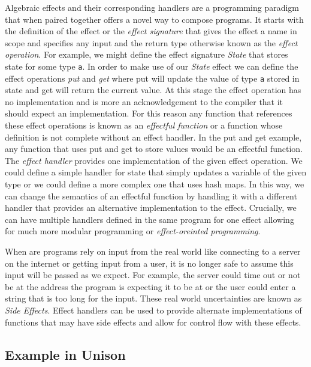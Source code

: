 \documentclass[logo,bsc,singlespacing,parskip]{infthesis}
\begin{document}
Algebraic effects \cite{plotkin2002computational} and their corresponding
handlers \cite{plotkin2009handlers} \cite{pretnar2015introduction} are a
programming paradigm that when paired together offers a novel way to compose
programs. It starts with the definition of the effect or the \emph{effect
signature} that gives the effect a name in scope and specifies any input and the
return type otherwise known as the \emph{effect operation}.  For example, we
might define the effect signature \emph{State} that stores state for some type
\texttt{a}. In order to make use of our \emph{State} effect we can define the
effect operations \emph{put} and \emph{get} where put will update the value of
type \texttt{a} stored in state and get will return the current value.  At this
stage the effect operation has no implementation and is more an acknowledgement
to the compiler that it should expect an implementation. For this reason any
function that references these effect operations is known as an \emph{effectful
function} or a function whose definition is not complete without an effect
handler. In the put and get example, any function that uses put and get to store
values would be an effectful function. The \emph{effect handler} provides one
implementation of the given effect operation. We could define a simple handler
for state that simply updates a variable of the given type or we could define a
more complex one that uses hash maps.  In this way, we can change the semantics
of an effectful function by handling it with a different handler that provides
an alternative implementation to the effect. Crucially, we can have multiple
handlers defined in the same program for one effect allowing for much more
modular programming or \emph{effect-oreinted programming}.

When are programs rely on input from the real world like connecting to a server
on the internet or getting input from a user, it is no longer safe to assume
this input will be passed as we expect. For example, the server could time out
or not be at the address the program is expecting it to be at or the user could
enter a string that is too long for the input. These real world uncertainties
are known as \emph{Side Effects}. Effect handlers can be used to provide
alternate implementations of functions that may have side effects and allow for
control flow with these effects.

\subsection{Example in Unison}
\label{subsection:unison}
\end{document}
